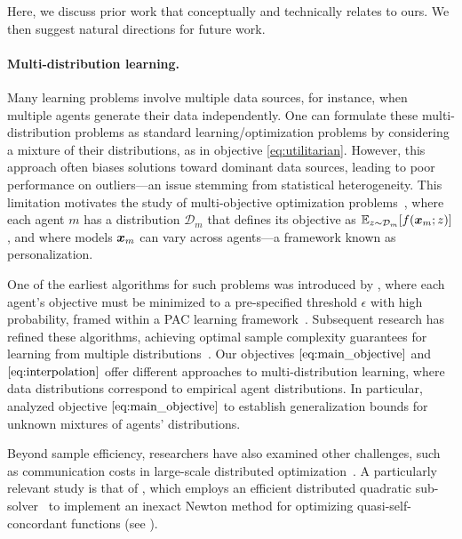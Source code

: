 Here, we discuss prior work that conceptually and technically relates to ours. We then suggest natural directions for future work.

\paragraph{Multi-distribution learning.}
Many learning problems involve multiple data sources, for instance, when multiple agents generate their data independently. One can formulate these multi-distribution problems as standard learning/optimization problems by considering a mixture of their distributions, as in objective \ref{eq:utilitarian}. However, this approach often biases solutions toward dominant data sources, leading to poor performance on outliers—an issue stemming from statistical heterogeneity. This limitation motivates the study of multi-objective optimization problems~\citep{miettinen1999nonlinear, ehrgott2005multicriteria}, where each agent \( m \) has a distribution \( \mathcal{D}_m \) that defines its objective as \( \mathbb{E}_{z\sim \mathcal{D}_m}[f(\bm{x}_m;z)] \), and where models \( \bm{x}_m \) can vary across agents---a framework known as personalization. 

One of the earliest algorithms for such problems was introduced by \citet{blum2017collaborative}, where each agent's objective must be minimized to a pre-specified threshold \( \epsilon \) with high probability, framed within a PAC learning framework~\citep{valiant1984theory,vapnik2013nature}. Subsequent research has refined these algorithms, achieving optimal sample complexity guarantees for learning from multiple distributions~\citep{chen2018tight,nguyen2018improved,hanneke2019value,haghtalab2022demand,zhang2024optimal}. Our objectives \( \ref{eq:main_objective} \) and \( \ref{eq:interpolation} \) offer different approaches to multi-distribution learning, where data distributions correspond to empirical agent distributions. In particular, \citet{mohri2019agnostic} analyzed objective \( \ref{eq:main_objective} \) to establish generalization bounds for unknown mixtures of agents' distributions. 

Beyond sample efficiency, researchers have also examined other challenges, such as communication costs in large-scale distributed optimization~\citep{mcmahan2016s}. A particularly relevant study is that of \citet{bullins2021stochastic}, which employs an efficient distributed quadratic sub-solver~\citep{woodworth2020local,patel2024limits} to implement an inexact Newton method for optimizing quasi-self-concordant functions (see ).

